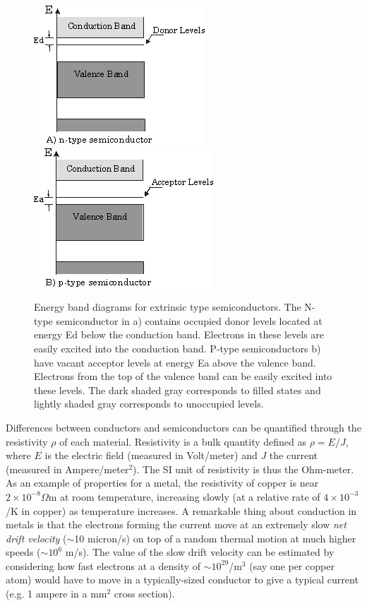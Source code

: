 \documentclass{../lab}
\begin{document}
\begin{figure}[h]
    \centering
    \href{http://experimentationlab.berkeley.edu/sites/default/files/images/SHEimage023.gif}{\includegraphics[width=0.33\linewidth,keepaspectratio]{images/SHEimage023.png}}
    \href{http://experimentationlab.berkeley.edu/sites/default/files/images/SHEimage024.gif}{\includegraphics[width=0.33\linewidth,keepaspectratio]{images/SHEimage024.png}}
    \caption{Energy band diagrams for extrinsic type semiconductors. The N-type semiconductor in a) contains occupied donor levels located at energy Ed below the conduction band. Electrons in these levels are easily excited into the conduction band. P-type semiconductors b) have vacant acceptor levels at energy Ea above the valence band. Electrons from the top of the valence band can be easily excited into these levels. The dark shaded gray corresponds to filled states and lightly shaded gray corresponds to unoccupied levels.}
\end{figure}

Differences between conductors and semiconductors can be quantified through the resistivity $\rho$ of each material. Resistivity is a bulk quantity defined as $\rho = E/J$, where $E$ is the electric field (measured in Volt/meter) and $J$ the current (measured in Ampere/meter$^2$). The SI unit of resistivity is thus the Ohm-meter. As an example of properties for a metal, the resistivity of copper is near $2 \times 10^{-8} \Omega$m at room temperature, increasing slowly (at a relative rate of $4 \times 10^{-3}$/K in copper) as temperature increases. A remarkable thing about conduction in metals is that the electrons forming the current move at an extremely slow \emph{net drift velocity} ($\sim$10 micron/s) on top of a random thermal motion at much higher speeds ($\sim 10^6$ m/s). The value of the slow drift velocity can be estimated by considering how fast electrons at a density of $\sim 10^{29}$/m$^3$ (say one per copper atom) would have to move in a typically-sized conductor to give a typical current (e.g. 1 ampere in a mm$^{2}$ cross section).
\end{document}
